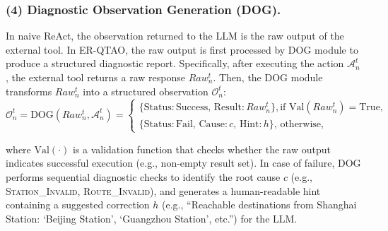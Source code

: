 \documentclass[runningheads]{llncs}
\begin{document}
\subsubsection{(4) Diagnostic Observation Generation (DOG).}\label{sec:dog}
In naive ReAct, the observation returned to the LLM is the raw output of the external tool. 
In ER-QTAO, the raw output is first processed by DOG module to produce a structured diagnostic report. Specifically, after executing the action $\mathcal{A}_n^t$, the external tool returns a raw response $Raw_n^t$. 
Then, the DOG module transforms $Raw_n^t$ into a structured observation $\mathcal{O}_n^t$:
\begin{equation}
    \mathcal{O}_{n}^{t} = \text{DOG}(Raw_{n}^{t}, \mathcal{A}_{n}^{t}) = 
    \begin{cases}
        \{\text{Status}: \text{Success},\,\text{Result}: Raw_{n}^{t}\},  \text{if } \text{Val}(Raw_{n}^{t}) = \text{True}, \\
        \{\text{Status}: \text{Fail},\,\text{Cause}: c,\, \text{Hint}: h\}, \, \text{otherwise},
    \end{cases}
    \label{eq:dog}
\end{equation}

\noindent where $\text{Val}(\cdot)$ is a validation function that checks whether the raw output indicates successful execution (e.g., non-empty result set). In case of failure, DOG performs sequential diagnostic checks to identify the root cause $c$ (e.g., \textsc{Station\_Invalid}, \textsc{Route\_Invalid}), and generates a human-readable hint containing a suggested correction $h$ (e.g., ``Reachable destinations from Shanghai Station: `Beijing Station', `Guangzhou Station', etc.'') for the LLM.



\end{document}
